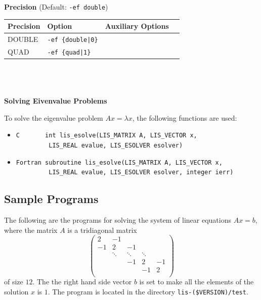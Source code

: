 \documentclass[a4paper]{article}
\begin{document}
\\ \\
\begin{minipage}[t]{\textwidth}
\begin{center}
{\bf Precision} (Default: \verb=-ef double=)\\
\begin{tabular}{l|lll}\hline\hline
Precision     & Option           & Auxiliary Options \\ \hline
DOUBLE   & \verb=-ef {double|0}=    &   \\
QUAD     & \verb=-ef {quad|1}=      &   \\
\hline         
\end{tabular}
\end{center}
\end{minipage}
\\ \\ \\
\noindent
{\bf Solving Eivenvalue Problems}

To solve the eigenvalue problem $Ax = \lambda x$, the following functions are used:
\begin{itemize}
\item \verb|C       int lis_esolve(LIS_MATRIX A, LIS_VECTOR x,|\\ 
      \verb|         LIS_REAL evalue, LIS_ESOLVER esolver)|
\item \verb|Fortran subroutine lis_esolve(LIS_MATRIX A, LIS_VECTOR x,|\\
      \verb|         LIS_REAL evalue, LIS_ESOLVER esolver, integer ierr)|
\end{itemize}

\subsection{Sample Programs}
\label{sec:testprog3}
The following are the programs for solving the system of linear equations $Ax = b$, where the
matrix $A$ is a tridiagonal matrix 
\[
\left(
\begin{array}{ccccc}
2 & -1 &   &  &   \\
-1 & 2 & -1 &  &   \\
  & \ddots  & \ddots  & \ddots  &   \\
  &   & -1 & 2 & -1 \\
  &   &   & -1 & 2 \\
\end{array}
\right)
\]
of size $12$.
The the right hand side vector $b$ is set to make all
the elements of the solution $x$ is $1$. 
The program is located in the directory \verb|lis-($VERSION)/test|. 
\end{document}
